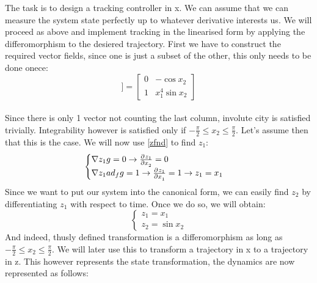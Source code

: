     {
        The task is to design a tracking controller in x. We can assume that we can measure the system state perfectly up to whatever derivative interests us.
        We will proceed as above and implement tracking in the linearised form by applying the differomorphism to the desiered trajectory.
        First we have to construct the required vector fields, since one is just a subset of the other, this only needs to be done onece:
        \begin{equation}
            [g,[f,g]] = \begin{bmatrix}
                0 & -\cos{x_2} \\
                1 & x_1^{4}\sin{x_2}
            \end{bmatrix}
        \end{equation}\\
        Since there is only 1 vector not counting the last column, involute city is satisfied trivially.
        Integrability however is satisfied only if $ - \frac{\pi}{2} \le x_2 \le \frac{\pi }{2}$. Let's assume then that
        this is the case. We will now use  \ref{zfnd} to find $z_1$:
        \begin{equation}
            \begin{cases}
            \nabla z_1 g = 0 \rightarrow  \frac{\partial^{}z_1}{\partial x_2^{}} = 0\\
            \nabla z_1 ad_fg = 1 \rightarrow  \frac{\partial^{}z_1}{\partial x_1^{}} = 1 \rightarrow  z_1 = x_1
            \end{cases}
        \end{equation}
        Since we want to put our system into the canonical form, we can easily find $z_2$ by differentiating $z_1$ with respect to time. Once we do so, we will obtain:
        \begin{equation}
            \label{dif}
            \begin{cases}
                z_1 = x_1\\
                z_2 = \sin{x_2}
            \end{cases}
        \end{equation}
        And indeed, thusly defined transformation is a differomorphism as long as $- \frac{\pi }{2} \le x_2 \le \frac{\pi }{2}$. We will later use this to transform a trajectory in x to a trajectory in z.
        This however represents the state transformation, the dynamics are now represented as follows:
        \begin{equation}


\end{equation}}
